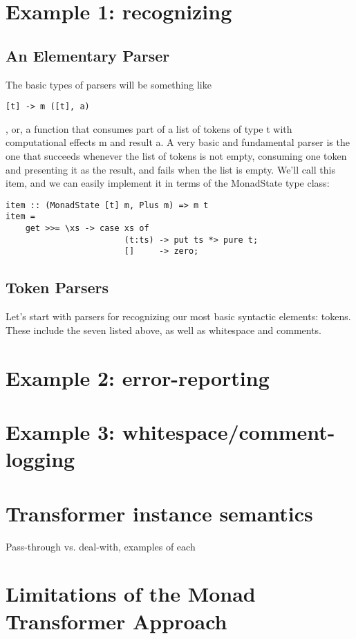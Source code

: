 \documentclass{tmr}
\begin{document}
\section{Example 1: recognizing}

\subsection{An Elementary Parser}
The basic types of parsers will be something like
\begin{verbatim}[t] -> m ([t], a)\end{verbatim}, or, a function that consumes
part of a list of tokens of type t with computational effects m and
result a.
A very basic and fundamental parser is the one that succeeds whenever
the list of tokens is not empty, consuming one token and presenting it
as the result, and fails when the list is empty.  We'll call this item,
and we can easily implement it in terms of the MonadState type class:
\begin{verbatim}
item :: (MonadState [t] m, Plus m) => m t
item =
    get >>= \xs -> case xs of
                        (t:ts) -> put ts *> pure t;
                        []     -> zero;
\end{verbatim}

\subsection{Token Parsers}
Let's start with parsers for recognizing our most basic syntactic elements:  tokens.
These include the seven listed above, as well as whitespace and comments.


\section{Example 2: error-reporting}

\section{Example 3: whitespace/comment-logging}




\section{Transformer instance semantics}

Pass-through vs. deal-with, examples of each


\section{Limitations of the Monad Transformer Approach}
\end{document}
